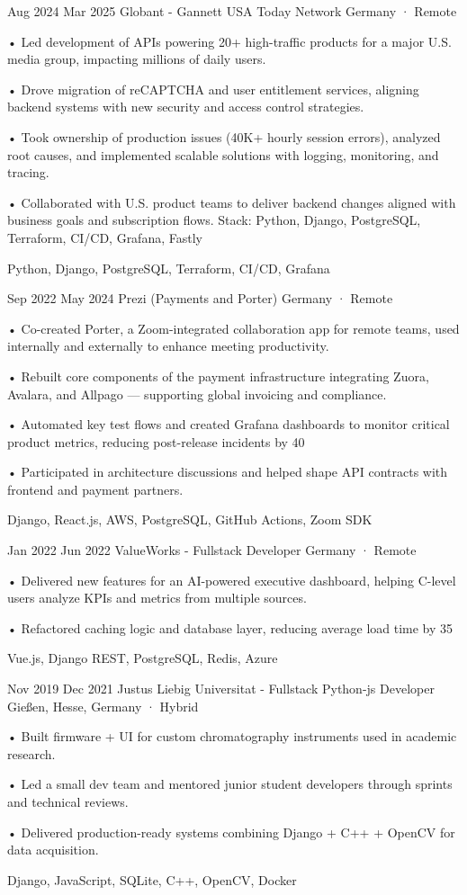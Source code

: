 \documentclass[a4paper,nocolors]{friggeri-cv}
\begin{document}
\begin{entrylist}


\entryexperience
{Aug 2024}
{Mar 2025}
{Globant - Gannett USA Today Network }
{Germany · Remote}
{
• Led development of APIs powering 20+ high-traffic products for a major U.S. media group, impacting millions of daily users.

• Drove migration of reCAPTCHA and user entitlement services, aligning backend systems with new security and access control strategies.

• Took ownership of production issues (40K+ hourly session errors), analyzed root causes, and implemented scalable solutions with logging, monitoring, and tracing.

• Collaborated with U.S. product teams to deliver backend changes aligned with business goals and subscription flows.
Stack: Python, Django, PostgreSQL, Terraform, CI/CD, Grafana, Fastly
}
{Python, Django, PostgreSQL, Terraform, CI/CD, Grafana}

\entryexperience
{Sep 2022}
{May 2024}
{Prezi (Payments and Porter)}
{Germany · Remote}
{
• Co-created Porter, a Zoom-integrated collaboration app for remote teams, used internally and externally to enhance meeting productivity.

• Rebuilt core components of the payment infrastructure integrating Zuora, Avalara, and Allpago — supporting global invoicing and compliance.

• Automated key test flows and created Grafana dashboards to monitor critical product metrics, reducing post-release incidents by 40%

• Participated in architecture discussions and helped shape API contracts with frontend and payment partners.
}
{Django, React.js, AWS, PostgreSQL, GitHub Actions, Zoom SDK}


\entryexperience
{Jan 2022}
{Jun 2022}
{ValueWorks - Fullstack Developer}
{Germany · Remote}
{
• Delivered new features for an AI-powered executive dashboard, helping C-level users analyze KPIs and metrics from multiple sources.

• Refactored caching logic and database layer, reducing average load time by 35%
}
{Vue.js, Django REST, PostgreSQL, Redis, Azure}

\entryexperience
{Nov 2019}
{Dec 2021}
{Justus Liebig Universitat - Fullstack Python-js Developer}
{Gießen, Hesse, Germany · Hybrid}
{
• Built firmware + UI for custom chromatography instruments used in academic research.

• Led a small dev team and mentored junior student developers through sprints and technical reviews.

• Delivered production-ready systems combining Django + C++ + OpenCV for data acquisition.
}
{Django, JavaScript, SQLite, C++, OpenCV, Docker}

\end{entrylist}
\end{document}
